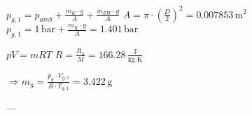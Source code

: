 \( p_{g,1} = p_{amb} + \frac{m_{K} \cdot g}{A} + \frac{m_{EW} \cdot g}{A} \)  
\( A = \pi \cdot \left(\frac{D}{2}\right)^2 = 0.007853 \, \text{m}^2 \)  
\( p_{g,1} = 1 \, \text{bar} + \frac{m_{K} \cdot g}{A} = 1.401 \, \text{bar} \)  

\( pV = mRT \)  
\( R = \frac{R_u}{M} = 166.28 \, \frac{\text{J}}{\text{kg} \cdot \text{K}} \)  

\( \Rightarrow m_g = \frac{p_{g} \cdot V_{g,1}}{R \cdot T_{g,1}} = 3.422 \, \text{g} \)  

---
